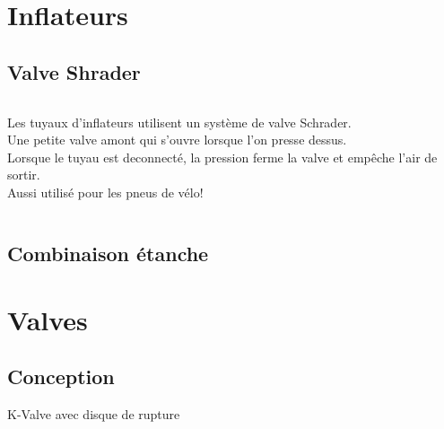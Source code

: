 \documentclass[aspectratio=1610,english,12pt]{beamer}
\begin{document}
\section{Inflateurs}

\subsection{Valve Shrader}
\begin{frame}{\insertsubsection}
	\begin{columns}[onlytextwidth]
			Les tuyaux d'inflateurs utilisent un système de valve Schrader.\\
			Une petite valve amont qui s'ouvre lorsque l'on presse dessus.\\
			Lorsque le tuyau est deconnecté, la pression ferme la valve et empêche l'air de sortir.\\
			Aussi utilisé pour les pneus de vélo!
	\end{columns}
\end{frame}

\subsection{Combinaison étanche}
\begin{frame}{\insertsubsection}
\end{frame}

\begin{frame}{\insertsubsection}
\end{frame}

\section{Valves}

\subsection{Conception}

\begin{frame}{K-Valve avec disque de rupture}
\end{frame}
\end{document}
